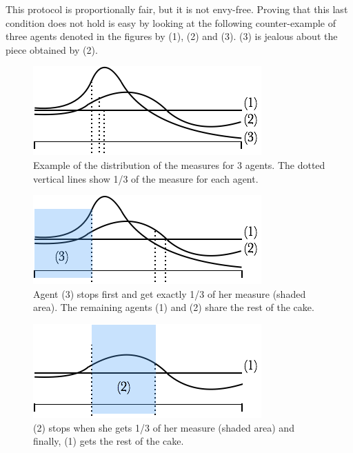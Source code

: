 This protocol is proportionally fair, but it is not envy-free. 
Proving that this last condition does not hold is easy by looking at the following counter-example
of three agents denoted in the figures by (1), (2) and (3).
(3) is jealous about the piece obtained by (2). 
\begin{figure}[htb]
\begin{center}
        \includegraphics[scale=0.6]{FiguresMaths/CakeEnvyFree1}
        \caption{Example of the distribution of the measures for 3 agents.
        The dotted vertical lines show 1/3 of the measure for each agent.}
        \label{Fig:cakeEnvyFree1}
\end{center}
\end{figure}
\begin{figure}[htb]
\begin{center}
        \includegraphics[scale=0.6]{FiguresMaths/CakeEnvyFree2}
        \caption{Agent (3) stops first and get exactly 1/3 of her measure (shaded area).
        The remaining agents (1) and (2) share the rest of the cake. }
        \label{Fig:cakeEnvyFree2}
\end{center}
\end{figure}
\begin{figure}[htb]
\begin{center}
        \includegraphics[scale=0.6]{FiguresMaths/CakeEnvyFree3}
        \caption{(2) stops when she gets 1/3 of her measure (shaded area) and finally, (1) gets the rest of the cake.}
        \label{Fig:cakeEnvyFree3}
\end{center}
\end{figure}


